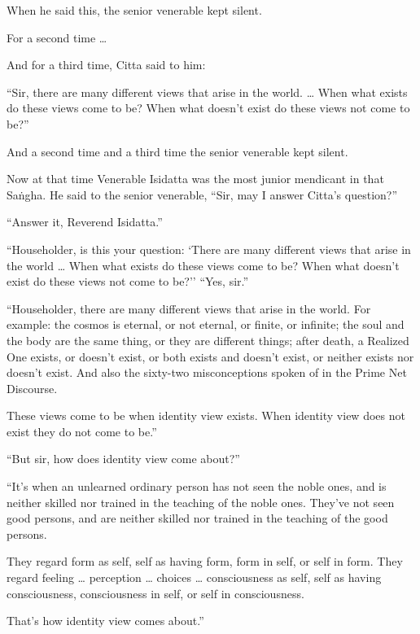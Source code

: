 \documentclass[12pt,openany]{book}%
\begin{document}
When he said this, the senior venerable kept silent. 

For a second time … 

And for a third time, Citta said to him: 

“Sir, there are many different views that arise in the world. … When what exists do these views come to be? When what doesn’t exist do these views not come to be?” 

And a second time and a third time the senior venerable kept silent. 

Now at that time Venerable Isidatta was the most junior mendicant in that \textsanskrit{Saṅgha}. He said to the senior venerable, “Sir, may I answer Citta’s question?” 

“Answer it, Reverend Isidatta.” 

“Householder, is this your question: ‘There are many different views that arise in the world … When what exists do these views come to be? When what doesn’t exist do these views not come to be?’’ “Yes, sir.” 

“Householder, there are many different views that arise in the world. For example: the cosmos is eternal, or not eternal, or finite, or infinite; the soul and the body are the same thing, or they are different things; after death, a Realized One exists, or doesn’t exist, or both exists and doesn’t exist, or neither exists nor doesn’t exist. And also the sixty-two misconceptions spoken of in the Prime Net Discourse. 

These views come to be when identity view exists. When identity view does not exist they do not come to be.” 

“But sir, how does identity view come about?” 

“It’s when an unlearned ordinary person has not seen the noble ones, and is neither skilled nor trained in the teaching of the noble ones. They’ve not seen good persons, and are neither skilled nor trained in the teaching of the good persons. 

They regard form as self, self as having form, form in self, or self in form. They regard feeling … perception … choices … consciousness as self, self as having consciousness, consciousness in self, or self in consciousness. 

That’s how identity view comes about.” 
\end{document}
